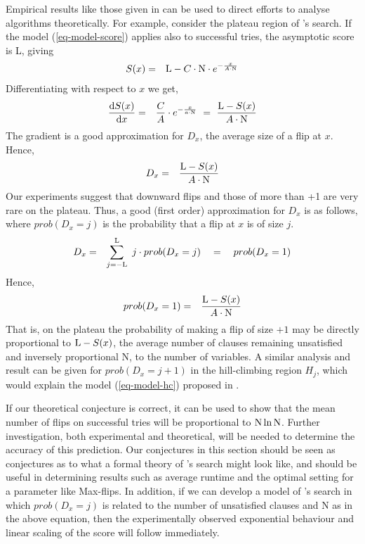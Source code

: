 Empirical results like those given in 
can be used to direct efforts to analyse algorithms
theoretically. For example, consider the plateau region of
\GSAT's search.
If the model (\ref{eq-model-score}) applies also to 
successful tries, the asymptotic score is L, 
giving
\begin{eqnarray*}
S(x) & = & \mbox{\rm L} - C\cdot \mbox{\rm N} \cdot e^{-\frac{x}{A\cdot \mbox{\rm \tiny N}}}
\end{eqnarray*}
Differentiating with respect to $x$ we get,
\begin{eqnarray*}
\frac{\mbox{\rm d} S(x)}{\mbox{\rm d}x} & = & \frac{C}{A}\cdot e^{-\frac{x}{a\cdot \mbox{\rm \tiny N}}} 
~ = ~ \frac{\mbox{\rm L}-S(x)}{A\cdot \mbox{\rm N}}
\end{eqnarray*}
The gradient is a good approximation for
$D_x$, the average size of a flip at $x$. Hence,
\begin{eqnarray*}
D_x & = & \frac{\mbox{\rm L}-S(x)}{A \cdot \mbox{\rm N}}
\end{eqnarray*}
Our experiments suggest that downward flips and those of more 
than +1 are very rare on the plateau. Thus, a good (first order) approximation
for $D_x$ is as follows,
where
$prob(D_x=j)$ is the probability that
a flip at $x$ is of size $j$. 
\begin{eqnarray*}
D_x & = & \sum_{j=-\mbox{\rm \scriptsize L}}^{\mbox{\rm \scriptsize L}} \ j\cdot prob(D_x=j) ~~~=~~~ prob(D_x=1)
\end{eqnarray*}
Hence,
\begin{eqnarray*}
prob(D_x=1) & = & \frac{\mbox{\rm L}-S(x)}{A\cdot \mbox{\rm N}}
\end{eqnarray*}
That is, on the plateau the probability of making a flip of size $+1$ may
be
directly proportional to $\mbox{\rm L} - S(x)$,
the average number of clauses remaining 
unsatisfied and inversely proportional N, to the number of variables. 
A similar analysis and result can be given for $prob(D_x=j+1)$ in the
hill-climbing region $H_j$, which would explain the model
(\ref{eq-model-hc}) proposed in . 

If our theoretical conjecture is correct, it can be used to show
that the mean number of
flips on successful tries will be proportional to ${\rm N} \ln {\rm N}$.
Further investigation, both 
experimental and theoretical, will be needed to determine the accuracy of 
this prediction.
Our conjectures in this section should be seen as conjectures as to
what a formal theory of \GSAT's search might look like,
and should
be useful in determining results
such as average runtime and the optimal setting for a parameter
like Max-flips.  In addition, if we can develop a model of \GSAT's
search in which $prob(D_x=j)$ is related to the number of unsatisfied
clauses and N as in the above equation, then the experimentally
observed exponential behaviour
and linear scaling of the score will follow immediately. 



